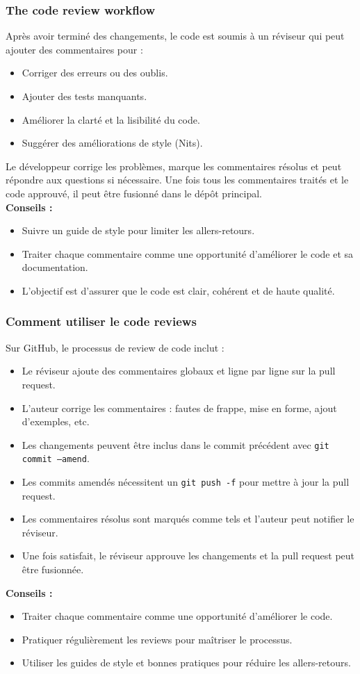 \documentclass{article}
\begin{document}
\subsubsection{The code review workflow}
Après avoir terminé des changements, le code est soumis à un réviseur qui peut ajouter des commentaires pour :
\begin{itemize}
    \item Corriger des erreurs ou des oublis.
    \item Ajouter des tests manquants.
    \item Améliorer la clarté et la lisibilité du code.
    \item Suggérer des améliorations de style (Nits).
\end{itemize}
Le développeur corrige les problèmes, marque les commentaires résolus et peut répondre aux questions si nécessaire.  
Une fois tous les commentaires traités et le code approuvé, il peut être fusionné dans le dépôt principal.
\\
\textbf{Conseils :}
\begin{itemize}
    \item Suivre un guide de style pour limiter les allers-retours.
    \item Traiter chaque commentaire comme une opportunité d’améliorer le code et sa documentation.
    \item L’objectif est d’assurer que le code est clair, cohérent et de haute qualité.
\end{itemize}

\subsubsection{Comment utiliser le code reviews}
Sur GitHub, le processus de review de code inclut :
\begin{itemize}
    \item Le réviseur ajoute des commentaires globaux et ligne par ligne sur la pull request.
    \item L'auteur corrige les commentaires : fautes de frappe, mise en forme, ajout d'exemples, etc.
    \item Les changements peuvent être inclus dans le commit précédent avec \texttt{git commit --amend}.
    \item Les commits amendés nécessitent un \texttt{git push -f} pour mettre à jour la pull request.
    \item Les commentaires résolus sont marqués comme tels et l'auteur peut notifier le réviseur.
    \item Une fois satisfait, le réviseur approuve les changements et la pull request peut être fusionnée.
\end{itemize}
\textbf{Conseils :}
\begin{itemize}
    \item Traiter chaque commentaire comme une opportunité d'améliorer le code.
    \item Pratiquer régulièrement les reviews pour maîtriser le processus.
    \item Utiliser les guides de style et bonnes pratiques pour réduire les allers-retours.
\end{itemize}
\end{document}

